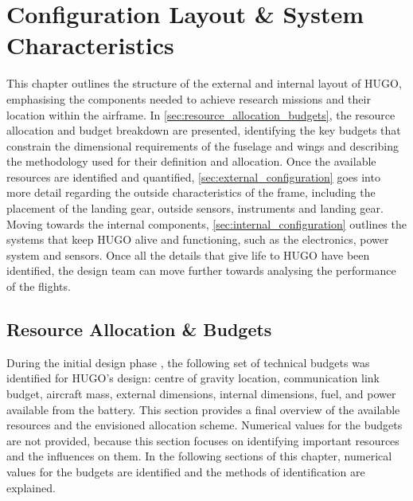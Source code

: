 \chapter{Configuration Layout \& System Characteristics}
\label{ch:configuration_layout}



This chapter outlines the structure of the external and internal layout of HUGO, emphasising the components needed to achieve research missions and their location within the airframe. In \autoref{sec:resource_allocation_budgets}, the resource allocation and budget breakdown are presented, identifying the key budgets that constrain the dimensional requirements of the fuselage and wings and describing the methodology used for their definition and allocation.
Once the available resources are identified and quantified, \autoref{sec:external_configuration} goes into more detail regarding the outside characteristics of the frame, including the placement of the landing gear, outside sensors, instruments and landing gear. Moving towards the internal components, \autoref{sec:internal_configuration} outlines the systems that keep HUGO alive and functioning, such as the electronics, power system and sensors. Once all the details that give life to HUGO have been identified, the design team can move further towards analysing the performance of the flights.

\section{Resource Allocation \& Budgets}
\label{sec:resource_allocation_budgets}
During the initial design phase , the following set of technical budgets was identified for HUGO's design: centre of gravity location, communication link budget, aircraft mass, external dimensions, internal dimensions, fuel, and power available from the battery. This section provides a final overview of the available resources and the envisioned allocation scheme. Numerical values for the budgets are not provided, because this section focuses on identifying important resources and the influences on them. In the following sections of this chapter, numerical values for the budgets are identified and the methods of identification are explained.


